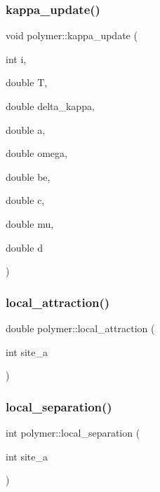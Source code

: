 \subsubsection{\texorpdfstring{kappa\+\_\+update()}{kappa\_update()}}
{\footnotesize\ttfamily void polymer\+::kappa\+\_\+update (\begin{DoxyParamCaption}\item[{int}]{i,  }\item[{double}]{T,  }\item[{double}]{delta\+\_\+kappa,  }\item[{double}]{a,  }\item[{double}]{omega,  }\item[{double}]{be,  }\item[{double}]{c,  }\item[{double}]{mu,  }\item[{double}]{d }\end{DoxyParamCaption})}

\hypertarget{classpolymer_a0e0d69f865ca798256019fbe725d4955}{}\label{classpolymer_a0e0d69f865ca798256019fbe725d4955} 
\subsubsection{\texorpdfstring{local\+\_\+attraction()}{local\_attraction()}}
{\footnotesize\ttfamily double polymer\+::local\+\_\+attraction (\begin{DoxyParamCaption}\item[{int}]{site\+\_\+a }\end{DoxyParamCaption})}

\hypertarget{classpolymer_af79e005223b39b6d5c7446295056baa1}{}\label{classpolymer_af79e005223b39b6d5c7446295056baa1} 
\subsubsection{\texorpdfstring{local\+\_\+separation()}{local\_separation()}}
{\footnotesize\ttfamily int polymer\+::local\+\_\+separation (\begin{DoxyParamCaption}\item[{int}]{site\+\_\+a }\end{DoxyParamCaption})}

